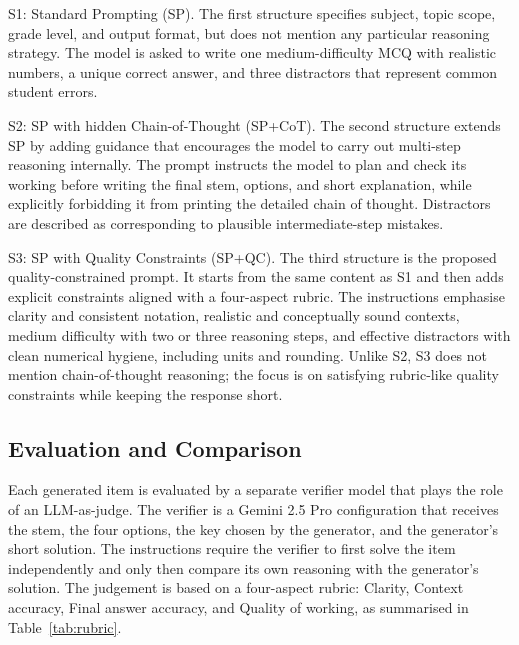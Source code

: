 \documentclass[a4paper,conference]{IEEEtran}
\begin{document}
S1: Standard Prompting (SP).  
The first structure specifies subject, topic scope, grade level, and output format, but does not mention any particular reasoning strategy. The model is asked to write one medium-difficulty MCQ with realistic numbers, a unique correct answer, and three distractors that represent common student errors.

S2: SP with hidden Chain-of-Thought (SP+CoT).  
The second structure extends SP by adding guidance that encourages the model to carry out multi-step reasoning internally. The prompt instructs the model to plan and check its working before writing the final stem, options, and short explanation, while explicitly forbidding it from printing the detailed chain of thought. Distractors are described as corresponding to plausible intermediate-step mistakes.

S3: SP with Quality Constraints (SP+QC).  
The third structure is the proposed quality-constrained prompt. It starts from the same content as S1 and then adds explicit constraints aligned with a four-aspect rubric. The instructions emphasise clarity and consistent notation, realistic and conceptually sound contexts, medium difficulty with two or three reasoning steps, and effective distractors with clean numerical hygiene, including units and rounding. Unlike S2, S3 does not mention chain-of-thought reasoning; the focus is on satisfying rubric-like quality constraints while keeping the response short.

\subsection{Evaluation and Comparison}

Each generated item is evaluated by a separate verifier model that plays the role of an LLM-as-judge. The verifier is a Gemini 2.5 Pro configuration that receives the stem, the four options, the key chosen by the generator, and the generator's short solution. The instructions require the verifier to first solve the item independently and only then compare its own reasoning with the generator's solution. The judgement is based on a four-aspect rubric: Clarity, Context accuracy, Final answer accuracy, and Quality of working, as summarised in Table~\ref{tab:rubric}.
\end{document}
